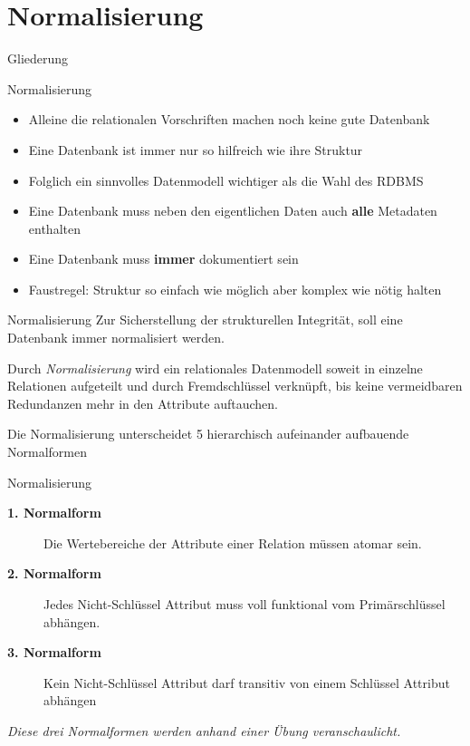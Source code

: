 \documentclass[18pt]{beamer}
\begin{document}
\section{Normalisierung}

\begin{frame}{Gliederung}
\tableofcontents[currentsection]
\end{frame}

\begin{frame}{Normalisierung}
\begin{itemize}
\item Alleine die relationalen Vorschriften machen noch keine gute Datenbank
\item Eine Datenbank ist immer nur so hilfreich wie ihre Struktur
\item Folglich ein sinnvolles Datenmodell wichtiger als die Wahl des RDBMS 
\item Eine Datenbank muss neben den eigentlichen Daten auch \textbf{alle} Metadaten enthalten
\item Eine Datenbank muss \textbf{immer} dokumentiert sein
\item Faustregel: Struktur so einfach wie möglich aber komplex wie nötig halten
\end{itemize}
\end{frame}

\begin{frame}{Normalisierung}
Zur Sicherstellung der strukturellen Integrität, soll eine Datenbank immer normalisiert werden.\bigskip\par
Durch \textit{Normalisierung} wird ein relationales Datenmodell soweit in einzelne Relationen aufgeteilt und durch Fremdschlüssel verknüpft, bis keine vermeidbaren Redundanzen mehr in den Attribute auftauchen.\bigskip\par
Die Normalisierung unterscheidet 5 hierarchisch aufeinander aufbauende Normalformen
\end{frame}

\begin{frame}{Normalisierung}
\begin{description}
\item [\textbf{1. Normalform}]Die Wertebereiche der Attribute einer Relation müssen atomar sein.
\item [\textbf{2. Normalform}]Jedes Nicht-Schlüssel Attribut muss voll funktional vom Primärschlüssel abhängen.
\item [\textbf{3. Normalform}]Kein Nicht-Schlüssel Attribut darf transitiv von einem Schlüssel Attribut abhängen
\end{description}
\vspace{0.5cm}
\textit{Diese drei Normalformen werden anhand einer Übung veranschaulicht.}
\end{frame}
\end{document}
